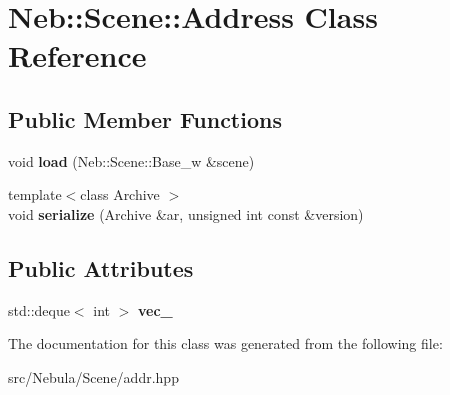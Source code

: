 \hypertarget{classNeb_1_1Scene_1_1Address}{\section{\-Neb\-:\-:\-Scene\-:\-:\-Address \-Class \-Reference}
\label{classNeb_1_1Scene_1_1Address}
}
\subsection*{\-Public \-Member \-Functions}
\begin{DoxyCompactItemize}
\item 
\hypertarget{classNeb_1_1Scene_1_1Address_a65de7a6c3019c2f0c17162d35c25574f}{void {\bfseries load} (\-Neb\-::\-Scene\-::\-Base\-\_\-w \&scene)}\label{classNeb_1_1Scene_1_1Address_a65de7a6c3019c2f0c17162d35c25574f}

\item 
\hypertarget{classNeb_1_1Scene_1_1Address_afaa1601ade0db0653ba97b82f598b10d}{{\footnotesize template$<$class Archive $>$ }\\void {\bfseries serialize} (\-Archive \&ar, unsigned int const \&version)}\label{classNeb_1_1Scene_1_1Address_afaa1601ade0db0653ba97b82f598b10d}

\end{DoxyCompactItemize}
\subsection*{\-Public \-Attributes}
\begin{DoxyCompactItemize}
\item 
\hypertarget{classNeb_1_1Scene_1_1Address_aa04e809c88ad0a868eb8898e2b827257}{std\-::deque$<$ int $>$ {\bfseries vec\-\_\-}}\label{classNeb_1_1Scene_1_1Address_aa04e809c88ad0a868eb8898e2b827257}

\end{DoxyCompactItemize}


\-The documentation for this class was generated from the following file\-:\begin{DoxyCompactItemize}
\item 
src/\-Nebula/\-Scene/addr.\-hpp\end{DoxyCompactItemize}
